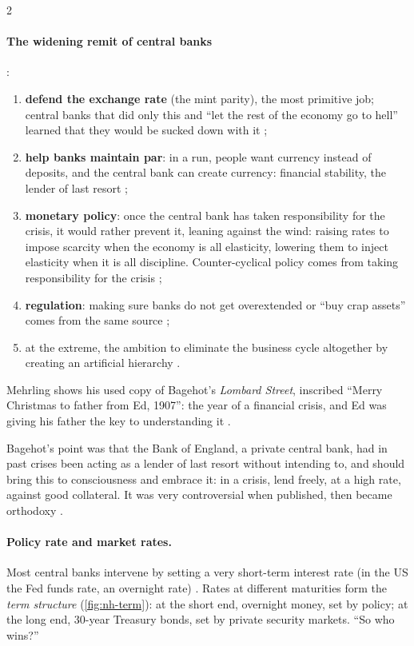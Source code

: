\begin{paracol}{2}
\paragraph{The widening remit of central banks} :
\begin{enumerate}
  \item \textbf{defend the exchange rate} (the mint parity), the most primitive job; central banks that did only this and
        ``let the rest of the economy go to hell'' learned that they would be sucked down with it ;
  \item \textbf{help banks maintain par}: in a run, people want currency instead of deposits, and the central bank can create
        currency: financial stability, the lender of last resort ;
  \item \textbf{monetary policy}: once the central bank has taken responsibility for the crisis, it would rather prevent it,
        leaning against the wind: raising rates to impose scarcity when the economy is all elasticity, lowering them to
        inject elasticity when it is all discipline. Counter-cyclical policy comes from taking responsibility for the
        crisis ;
  \item \textbf{regulation}: making sure banks do not get overextended or ``buy crap assets'' comes from the same source
        ;
  \item at the extreme, the ambition to eliminate the business cycle altogether by creating an artificial hierarchy
        .
\end{enumerate}

\begin{aside}
Mehrling shows his used copy of Bagehot's \emph{Lombard Street}, inscribed ``Merry Christmas to father from Ed, 1907'': the
year of a financial crisis, and Ed was giving his father the key to understanding it .
\end{aside}
Bagehot's point was that the Bank of England, a private central bank, had in past crises been acting as a lender of last
resort without intending to, and should bring this to consciousness and embrace it: in a crisis, lend freely, at a high
rate, against good collateral. It was very controversial when published, then became orthodoxy .

\paragraph{Policy rate and market rates.} Most central banks intervene by setting a very short-term interest rate (in the
US the Fed funds rate, an overnight rate) . Rates at different maturities form the \emph{term structure}
(\cref{fig:nh-term}): at the short end, overnight money, set by policy; at the long end, 30-year Treasury bonds, set by
private security markets. ``So who wins?'' 


\end{paracol}
